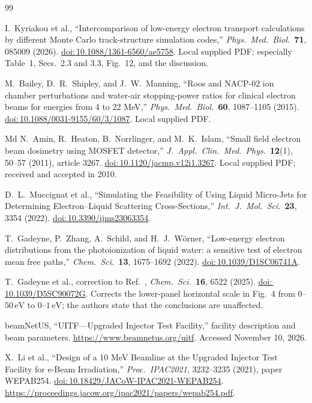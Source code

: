 \documentclass[11pt,letterpaper]{article}
\newcommand{\eV}{\,\mathrm{eV}}
\newcommand{\doi}[1]{\href{https://doi.org/#1}{doi:\,#1}}
\begin{document}
\begin{thebibliography}{99}

I.\ Kyriakou et al., ``Intercomparison of low-energy electron transport calculations by different
Monte Carlo track-structure simulation codes,'' \emph{Phys.\ Med.\ Biol.}\ \textbf{71}, 085009 (2026).
\doi{10.1088/1361-6560/ae5758}.
Local supplied PDF; especially Table~1, Secs.~2.3 and 3.3, Fig.~12, and the discussion.

M.\ Bailey, D.\ R.\ Shipley, and J.\ W.\ Manning, ``Roos and NACP-02 ion chamber perturbations
and water-air stopping-power ratios for clinical electron beams for energies from 4 to 22 MeV,''
\emph{Phys.\ Med.\ Biol.}\ \textbf{60}, 1087--1105 (2015).
\doi{10.1088/0031-9155/60/3/1087}. Local supplied PDF.

Md N.\ Amin, R.\ Heaton, B.\ Norrlinger, and M.\ K.\ Islam, ``Small field electron beam dosimetry
using MOSFET detector,'' \emph{J.\ Appl.\ Clin.\ Med.\ Phys.}\ \textbf{12}(1), 50--57 (2011),
article 3267. \doi{10.1120/jacmp.v12i1.3267}. Local supplied PDF; received and accepted in 2010.

D.\ L.\ Muccignat et al., ``Simulating the Feasibility of Using Liquid Micro-Jets for Determining
Electron--Liquid Scattering Cross-Sections,'' \emph{Int.\ J.\ Mol.\ Sci.}\ \textbf{23}, 3354 (2022).
\doi{10.3390/ijms23063354}.

T.\ Gadeyne, P.\ Zhang, A.\ Schild, and H.\ J.\ W\"orner, ``Low-energy electron distributions from
the photoionization of liquid water: a sensitive test of electron mean free paths,''
\emph{Chem.\ Sci.}\ \textbf{13}, 1675--1692 (2022). \doi{10.1039/D1SC06741A}.

T.\ Gadeyne et al., correction to Ref.~\cite{gadeyne}, \emph{Chem.\ Sci.}\ \textbf{16}, 6522 (2025).
\doi{10.1039/D5SC90072G}. Corrects the lower-panel horizontal scale in Fig.~4 from
$0$--$50\eV$ to $0$--$1\eV$; the authors state that the conclusions are unaffected.

beamNetUS, ``UITF---Upgraded Injector Test Facility,'' facility description and beam parameters.
\url{https://www.beamnetus.org/uitf}. Accessed November 10, 2026.

X.\ Li et al., ``Design of a 10 MeV Beamline at the Upgraded Injector Test Facility for e-Beam
Irradiation,'' \emph{Proc.\ IPAC2021}, 3232--3235 (2021), paper WEPAB254.
\doi{10.18429/JACoW-IPAC2021-WEPAB254}.
\url{https://proceedings.jacow.org/ipac2021/papers/wepab254.pdf}.


\end{thebibliography}
\end{document}
